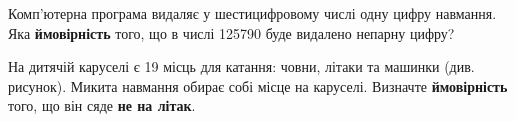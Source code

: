 \documentclass[12pt]{article}
\begin{document}
\begin{samepage}
\noindent\zadnum Комп’ютерна програма видаляє у шестицифровому числі одну цифру навмання. Яка \textbf{ймовірність} того, що в числі 125790 буде видалено непарну цифру? 

\nmtnobreak
\nopagebreak\nbvspace{0.3cm}
\par{}
\end{samepage}

\begin{samepage}
\noindent
\begin{minipage}[c]{0.56\textwidth}
\zadnum На дитячій каруселі є 19 місць для катання: човни, літаки та машинки (див. рисунок). Микита навмання обирає собі місце на каруселі. Визначте \textbf{ймовірність} того, що він сяде \textbf{не на літак}. 
\end{minipage}%
\hfill
\begin{minipage}[c]{0.40\textwidth}
\centering
\begin{nmtfit}\begin{tikzpicture}[scale=0.6, line join=round, line cap=round]%


\end{tikzpicture}
\end{nmtfit}
\end{minipage}
\end{samepage}
\end{document}
